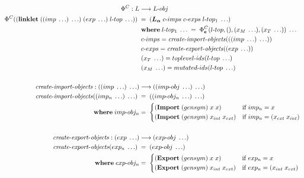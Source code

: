 \documentclass[sigplan,screen,anonymous]{acmart}
\def\dash {\text{-}}
\begin{document}
\begin{figure*}[tbp]
  \small
  \begin{align*}
    \Phi^C : L &\longrightarrow L\dash obj \\
    \Phi^C((\textbf{linklet}\; ((imp\; \ldots)\; \ldots)\; (exp\; \ldots)\; l\dash top\; \ldots))\; &=\; (\la\; c\dash imps\; c\dash exps\; l\dash top_1\; \ldots) \\
    \;        &\; \where l\dash top_1\; \ldots\; =\; \Phi^C_{\textbf{e}}(l\dash top,(),(x_M\;\ldots),(x_T\;\ldots))\; \ldots \\
    \;        &\; c\dash imps = \mathit{create\dash import\dash objects}(((imp\; \ldots)\; \ldots)) \\
    \;        &\; c\dash exps = \mathit{create\dash export\dash objects}((exp\; \ldots)) \\
    \;        &\; (x_T\;\ldots) = toplevel\dash ids(l\dash top\; \ldots) \\
    \;        &\; (x_M\;\ldots) = mutated\dash ids(l\dash top\; \ldots) \\ \\
    \mathit{create\dash import\dash objects} : ((imp\; \ldots)\; \ldots) &\longrightarrow ((imp\dash obj\; \ldots)\; \ldots) \\
    \mathit{create\dash import\dash objects}((imp_n\; \ldots)\; \ldots)\; &=\; ((imp\dash obj_n\; \ldots)\; \ldots) \\
    \;   \where imp\dash obj_n  &=\; \begin{cases*}
      (\textbf{Import}\;(gensym)\;x\;x) & if $imp_n = x$ \\
      (\textbf{Import}\;(gensym)\;x_{int}\;x_{ext}) & if $imp_n = (x_{ext}\;x_{int})$ \\
    \end{cases*} \\ \\
    \mathit{create\dash export\dash objects} : (exp\; \ldots) &\longrightarrow (exp\dash obj\; \ldots) \\
    \mathit{create\dash export\dash objects}(exp_n\; \ldots)\; &=\; (exp\dash obj\; \ldots) \\
    \;   \where exp\dash obj_n  &=\; \begin{cases*}
      (\textbf{Export}\;(gensym)\;x\;x) & if $exp_n = x$ \\
      (\textbf{Export}\;(gensym)\;x_{int}\;x_{ext}) & if $exp_n = (x_{int}\;x_{ext})$ \\
    \end{cases*} \\ \\

\end{align*}
\end{figure*}
\end{document}
